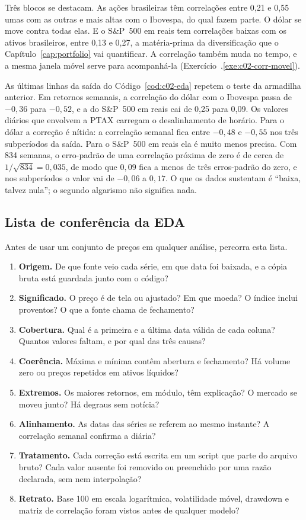 Três blocos se destacam. As ações brasileiras têm correlações entre 0,21 e 0,55 umas com as outras e mais altas com o Ibovespa, do qual fazem parte. O dólar se move contra todas elas. E o S\&P~500 em reais tem correlações baixas com os ativos brasileiros, entre 0,13 e 0,27, a matéria-prima da diversificação que o Capítulo~\ref{cap:portfolio} vai quantificar. A correlação também muda no tempo, e a mesma janela móvel serve para acompanhá-la (Exercício~\thechapter.\ref{exe:c02-corr-movel}).

As últimas linhas da saída do Código~\ref{cod:c02-eda} repetem o teste da armadilha anterior. Em retornos semanais, a correlação do dólar com o Ibovespa passa de $-0,36$ para $-0,52$, e a do S\&P~500 em reais cai de 0,25 para 0,09. Os valores diários que envolvem a PTAX carregam o desalinhamento de horário. Para o dólar a correção é nítida: a correlação semanal fica entre $-0,48$ e $-0,55$ nos três subperíodos da saída. Para o S\&P~500 em reais ela é muito menos precisa. Com 834 semanas, o erro-padrão de uma correlação próxima de zero é de cerca de $1/\sqrt{834} = 0,035$, de modo que $0,09$ fica a menos de três erros-padrão do zero, e nos subperíodos o valor vai de $-0,06$ a $0,17$. O que os dados sustentam é ``baixa, talvez nula''; o segundo algarismo não significa nada.

\subsection{Lista de conferência da EDA}

Antes de usar um conjunto de preços em qualquer análise, percorra esta lista.

\begin{enumerate}
  \item \textbf{Origem.} De que fonte veio cada série, em que data foi baixada, e a cópia bruta está guardada junto com o código?
  \item \textbf{Significado.} O preço é de tela ou ajustado? Em que moeda? O índice inclui proventos? O que a fonte chama de fechamento?
  \item \textbf{Cobertura.} Qual é a primeira e a última data válida de cada coluna? Quantos valores faltam, e por qual das três causas?
  \item \textbf{Coerência.} Máxima e mínima contêm abertura e fechamento? Há volume zero ou preços repetidos em ativos líquidos?
  \item \textbf{Extremos.} Os maiores retornos, em módulo, têm explicação? O mercado se moveu junto? Há degraus sem notícia?
  \item \textbf{Alinhamento.} As datas das séries se referem ao mesmo instante? A correlação semanal confirma a diária?
  \item \textbf{Tratamento.} Cada correção está escrita em um script que parte do arquivo bruto? Cada valor ausente foi removido ou preenchido por uma razão declarada, sem  nem interpolação?
  \item \textbf{Retrato.} Base 100 em escala logarítmica, volatilidade móvel, drawdown e matriz de correlação foram vistos antes de qualquer modelo?
\end{enumerate}

